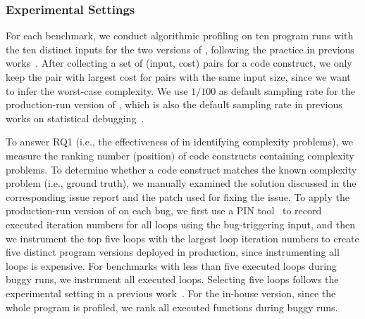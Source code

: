 

\subsubsection{Experimental Settings}

For each benchmark, we conduct algorithmic profiling on ten 
program runs with the ten distinct inputs for the two
versions of \Tool, following the practice in 
previous works~\cite{joy.asplos13,SongOOPSLA2014}.
After collecting a set of (input, cost) pairs for a code construct,
we only keep the pair with largest cost for pairs with the same input size,
since we want to infer the worst-case complexity.
We use $1/100$ as default sampling rate for 
the production-run version of \Tool, 
which is also the default sampling rate 
in previous works on statistical debugging~\cite{liblit03,CCI,ldoctor}.


To answer RQ1 (i.e., the effectiveness of  \Tool in identifying
complexity problems), we measure the ranking number (position) of code
constructs containing complexity problems. 
To determine whether a code construct matches
the known complexity problem (i.e., ground truth), 
we manually examined the solution discussed 
in the corresponding issue 
report and the patch used for fixing the issue. 
To apply the production-run version of \Tool on each bug,
we first use a PIN tool~\cite{pin} to record executed iteration 
numbers for all loops using the bug-triggering input,
and then we instrument the top five loops with the largest loop 
iteration numbers to create five distinct program versions
deployed in production, 
since instrumenting all loops is expensive. 
For benchmarks with less than five executed 
loops during buggy runs, 
we instrument all executed loops. Selecting five loops follows the 
experimental setting in a previous work~\cite{ldoctor}.
For the in-house version, since the whole program is profiled, 
we rank all executed functions during buggy runs. 


